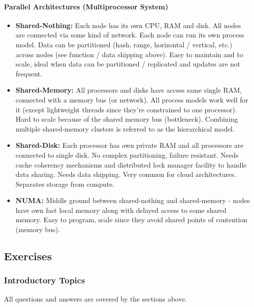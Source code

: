 \paragraph{Parallel Architectures (Multiprocessor System)}
\begin{itemize}
    \item \textbf{Shared-Nothing:} Each node has its own CPU, RAM and disk. All nodes are connected via some kind of network. Each node can run its own process model. Data can be partitioned (hash, range, horizontal / vertical, etc.) across nodes (see function / data shipping above). Easy to maintain and to scale, ideal when data can be partitioned / replicated and updates are not frequent.
    \item \textbf{Shared-Memory:} All processors and disks have access same single RAM, connected with a memory bus (or network). All process models work well for it (except lightweight threads since they're constrained to one processor). Hard to scale because of the shared memory bus (bottleneck). Combining multiple shared-memory clusters is referred to as the hierarchical model.
    \item \textbf{Shared-Disk:} Each processor has own private RAM and all processors are connected to single disk. No complex partitioning, failure resistant. Needs cache coherency mechanisms and distributed lock manager facility to handle data sharing. Needs data shipping. Very common for cloud architectures. Separates storage from compute.
    \item \textbf{NUMA:} Middle ground between shared-nothing and shared-memory - nodes have own fast local memory along with delayed access to some shared memory. Easy to program, scale since they avoid shared points of contention (memory bus). %
\end{itemize}


\subsection{Exercises}

\subsubsection{Introductory Topics}

All questions and answers are covered by the sections above.
